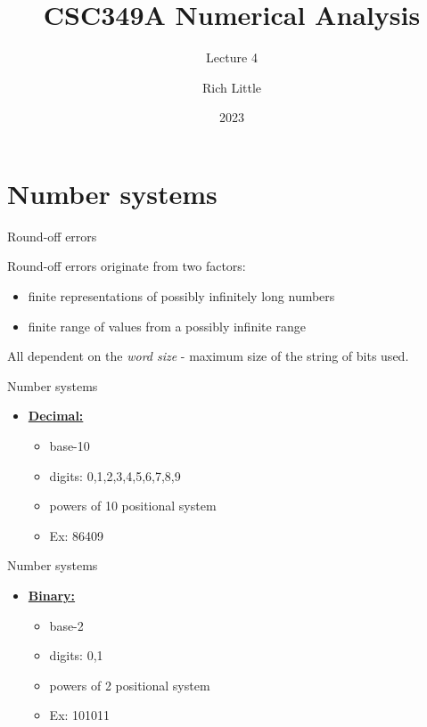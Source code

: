 \documentclass[12pt]{beamer}
\title[CSC349A Numerical Analysis]{CSC349A Numerical Analysis}
\subtitle[Leture 4]{Lecture 4}
\date[2023]{2023}
\author[R. Little]{Rich Little}
\institute[University of Victoria]{University of Victoria}
\begin{document}
\frame{\maketitle} %



\section{Number systems}

\begin{frame}{Round-off errors}

Round-off errors originate from two factors:

\begin{itemize}
\item{finite representations of possibly infinitely long numbers}
\item{finite range of values from a possibly infinite range}
\end{itemize}

All dependent on the {\it word size} - maximum size of the string of bits used.

\end{frame}

\begin{frame}{Number systems}
\begin{itemize}
\item{\underline{\bf Decimal:}}
\begin{itemize}
\item{base-10}
\item{digits: 0,1,2,3,4,5,6,7,8,9}
\item{powers of 10 positional system}
\item{Ex: 86409}
\end{itemize}
\end{itemize}
\vspace{3 in}
\end{frame}

\begin{frame}{Number systems}
\begin{itemize}
\item{\underline{\bf Binary:}}
\begin{itemize}
\item{base-2}
\item{digits: 0,1}
\item{powers of 2 positional system}
\item{Ex: 101011}
\end{itemize}
\end{itemize}
\vspace{3 in}
\end{frame}
\end{document}
